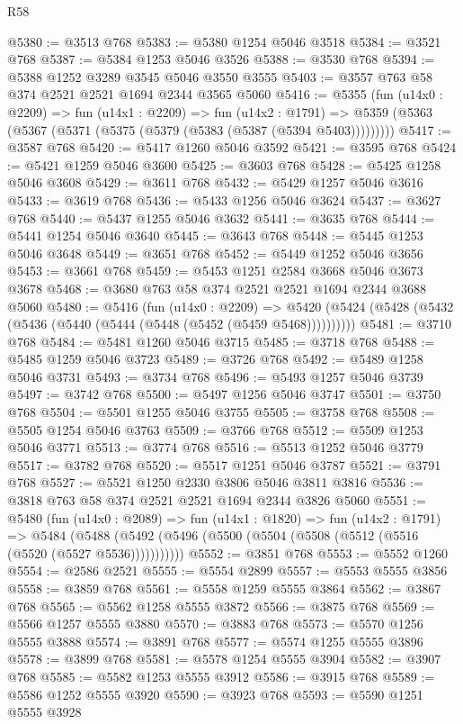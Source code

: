 \begin{lexlean}{R58}
\begin{coremodule}
@5380 := @3513 @768
@5383 := @5380 @1254 @5046 @3518
@5384 := @3521 @768
@5387 := @5384 @1253 @5046 @3526
@5388 := @3530 @768
@5394 := @5388 @1252 @3289 @3545 @5046 @3550 @3555
@5403 := @3557 @763 @58 @374 @2521 @2521 @1694 @2344 @3565 @5060
@5416 := @5355
    (fun (u14x0 : @2209) =>
    fun (u14x1 : @2209) =>
    fun (u14x2 : @1791) =>
    @5359 (@5363 (@5367 (@5371 (@5375 (@5379 (@5383 (@5387 (@5394 @5403)))))))))
@5417 := @3587 @768
@5420 := @5417 @1260 @5046 @3592
@5421 := @3595 @768
@5424 := @5421 @1259 @5046 @3600
@5425 := @3603 @768
@5428 := @5425 @1258 @5046 @3608
@5429 := @3611 @768
@5432 := @5429 @1257 @5046 @3616
@5433 := @3619 @768
@5436 := @5433 @1256 @5046 @3624
@5437 := @3627 @768
@5440 := @5437 @1255 @5046 @3632
@5441 := @3635 @768
@5444 := @5441 @1254 @5046 @3640
@5445 := @3643 @768
@5448 := @5445 @1253 @5046 @3648
@5449 := @3651 @768
@5452 := @5449 @1252 @5046 @3656
@5453 := @3661 @768
@5459 := @5453 @1251 @2584 @3668 @5046 @3673 @3678
@5468 := @3680 @763 @58 @374 @2521 @2521 @1694 @2344 @3688 @5060
@5480 := @5416
    (fun (u14x0 : @2209) =>
    @5420 (@5424 (@5428 (@5432 (@5436 (@5440 (@5444 (@5448 (@5452 (@5459 @5468))))))))))
@5481 := @3710 @768
@5484 := @5481 @1260 @5046 @3715
@5485 := @3718 @768
@5488 := @5485 @1259 @5046 @3723
@5489 := @3726 @768
@5492 := @5489 @1258 @5046 @3731
@5493 := @3734 @768
@5496 := @5493 @1257 @5046 @3739
@5497 := @3742 @768
@5500 := @5497 @1256 @5046 @3747
@5501 := @3750 @768
@5504 := @5501 @1255 @5046 @3755
@5505 := @3758 @768
@5508 := @5505 @1254 @5046 @3763
@5509 := @3766 @768
@5512 := @5509 @1253 @5046 @3771
@5513 := @3774 @768
@5516 := @5513 @1252 @5046 @3779
@5517 := @3782 @768
@5520 := @5517 @1251 @5046 @3787
@5521 := @3791 @768
@5527 := @5521 @1250 @2330 @3806 @5046 @3811 @3816
@5536 := @3818 @763 @58 @374 @2521 @2521 @1694 @2344 @3826 @5060
@5551 := @5480
    (fun (u14x0 : @2089) =>
    fun (u14x1 : @1820) =>
    fun (u14x2 : @1791) =>
    @5484 (@5488 (@5492 (@5496 (@5500 (@5504 (@5508 (@5512 (@5516 (@5520 (@5527 @5536)))))))))))
@5552 := @3851 @768
@5553 := @5552 @1260
@5554 := @2586 @2521
@5555 := @5554 @2899
@5557 := @5553 @5555 @3856
@5558 := @3859 @768
@5561 := @5558 @1259 @5555 @3864
@5562 := @3867 @768
@5565 := @5562 @1258 @5555 @3872
@5566 := @3875 @768
@5569 := @5566 @1257 @5555 @3880
@5570 := @3883 @768
@5573 := @5570 @1256 @5555 @3888
@5574 := @3891 @768
@5577 := @5574 @1255 @5555 @3896
@5578 := @3899 @768
@5581 := @5578 @1254 @5555 @3904
@5582 := @3907 @768
@5585 := @5582 @1253 @5555 @3912
@5586 := @3915 @768
@5589 := @5586 @1252 @5555 @3920
@5590 := @3923 @768
@5593 := @5590 @1251 @5555 @3928

\end{coremodule}
\end{lexlean}
